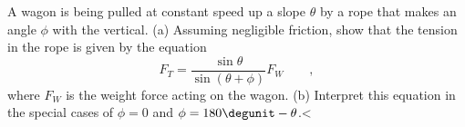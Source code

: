   A wagon is being pulled at constant speed up a slope
$\theta $ by a rope that makes an angle $\phi $ with the
vertical.\hwendpart
 (a) Assuming negligible friction, show that the
tension in the rope is given by the equation
\begin{equation*}
  F_T = \frac{\sin\theta}{\sin(\theta+\phi)}F_W \qquad   ,
\end{equation*}
where $F_W$ is the weight force acting on the wagon.\hwendpart
 (b)
Interpret this equation in the special cases of $\phi=0$
and $\phi =180\degunit-\theta$.<%
